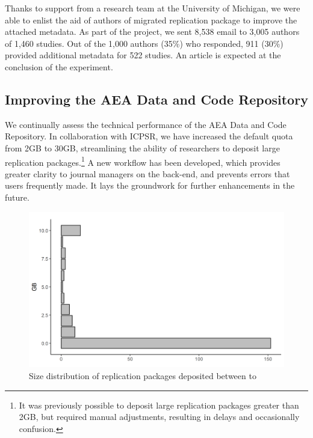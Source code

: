 \documentclass[PP]{AEA}
\newcommand{\aeadcr}{AEA Data and Code Repository}
\begin{document}

Thanks to support from a research team at the University of Michigan, we were able to enlist the aid of authors of migrated replication package to improve the attached metadata.  As part of the project, we sent 8,538 email to 3,005 authors of 1,460 studies. Out of the 1,000 authors (35\%) who responded, 911 (30\%) provided additional metadata for 522 studies. An article is expected at the conclusion of the experiment.

\subsection{Improving the \aeadcr{}}
\label{sec:improvingaeadcr}

We continually assess the technical performance of the \aeadcr{}. In collaboration with ICPSR, we have increased the default quota from 2GB to 30GB, streamlining the ability of researchers to deposit large replication packages.\footnote{It was previously possible to deposit large replication packages greater than 2GB, but required manual adjustments, resulting in delays and occasionally confusion.} A new workflow has been developed, which provides greater clarity to journal managers on the back-end, and prevents errors that users frequently made. It lays the groundwork for further enhancements in the future. 


\begin{figure}[t]
    \centering
    \includegraphics[width=\textwidth]{images/plot_filesize_dist.png} 
    \caption{Size distribution of replication packages deposited between  \firstday{} to \lastday{}}
    \label{fig:size_packages}
\end{figure}
\end{document}

